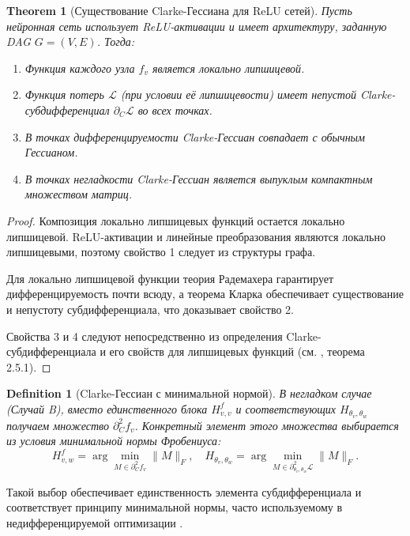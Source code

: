 \documentclass[11pt]{article}
\newtheorem{theorem}{Theorem}
\newtheorem{definition}{Definition}
\begin{document}
\begin{theorem}[Существование Clarke-Гессиана для ReLU сетей]
  Пусть нейронная сеть использует ReLU-активации и имеет архитектуру, заданную DAG $G = (V, E)$. Тогда:
  \begin{enumerate}
    \item Функция каждого узла $f_v$ является локально липшицевой.
    \item Функция потерь $\mathcal{L}$ (при условии её липшицевости) имеет непустой Clarke-субдифференциал
      $\partial_C \mathcal{L}$ во всех точках.
    \item В точках дифференцируемости Clarke-Гессиан совпадает с обычным Гессианом.
    \item В точках негладкости Clarke-Гессиан является выпуклым компактным множеством матриц.
  \end{enumerate}
\end{theorem}

\begin{proof}
  Композиция локально липшицевых функций остается локально липшицевой. ReLU-активации и линейные
  преобразования являются локально липшицевыми, поэтому свойство 1 следует из структуры графа.

  Для локально липшицевой функции теория Радемахера гарантирует дифференцируемость почти всюду, а теорема
  Кларка обеспечивает существование и непустоту субдифференциала, что доказывает свойство 2.

  Свойства 3 и 4 следуют непосредственно из определения Clarke-субдифференциала и его свойств для липшицевых
  функций (см. \citep{clarke1990optimization}, теорема 2.5.1).
\end{proof}

\begin{definition}[Clarke-Гессиан с минимальной нормой]
  В негладком случае (Случай B), вместо единственного блока $H^f_{v,v}$ и соответствующих
  $H_{\theta_v,\theta_w}$ получаем множество $\partial_C^2f_v$. Конкретный элемент этого множества выбирается
  из условия минимальной нормы Фробениуса:
  \[
    H^f_{v,w}
    = \arg\min_{M\in\partial_C^2 f_v}\|M\|_F,
    \quad
    H_{\theta_v,\theta_w}
    = \arg\min_{M\in\partial^2_{\theta_v,\theta_w}\!\mathcal L}\|M\|_F.
  \]
\end{definition}

Такой выбор обеспечивает единственность элемента субдифференциала и соответствует принципу минимальной нормы,
часто используемому в недифференцируемой оптимизации \citep{bolte2020conservative}.
\end{document}
